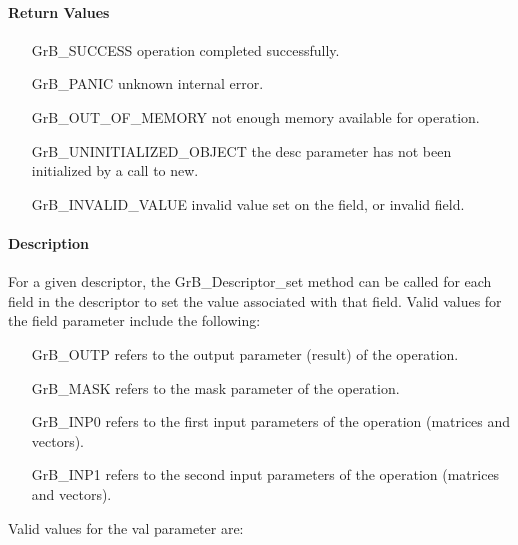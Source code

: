 \paragraph{Return Values}

\begin{itemize}[leftmargin=2.1in]
\item[{\sf GrB\_SUCCESS}]           operation completed successfully.
\item[{\sf GrB\_PANIC}]             unknown internal error.
\item[{\sf GrB\_OUT\_OF\_MEMORY}]          not enough memory available for operation.
\item[{\sf GrB\_UNINITIALIZED\_OBJECT}]          the {\sf desc} parameter has not been
                                    initialized by a call to {\sf new}.
\item[{\sf GrB\_INVALID\_VALUE}]    invalid value set on the field, or invalid field.
\end{itemize}

\paragraph{Description}

For a given descriptor, the {\sf GrB\_Descriptor\_set} method can be called for each
field in the descriptor to set the value associated with that field.  Valid values for the {\sf field} 
parameter include the following:

\begin{itemize}[leftmargin=1.5in]
\item[{\sf GrB\_OUTP}]   refers to the output parameter (result) of the operation.
\item[{\sf GrB\_MASK}]   refers to the mask parameter of the operation.
\item[{\sf GrB\_INP0}]   refers to the first input parameters of the operation (matrices and vectors). 
\item[{\sf GrB\_INP1}]   refers to the second input parameters of the operation (matrices and vectors). 
\end{itemize}

Valid values for the {\sf val} parameter are:

